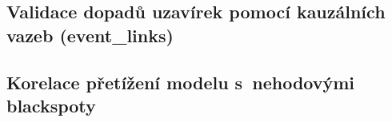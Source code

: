 \subsection{Validace dopadů uzavírek pomocí kauzálních vazeb (event\_links)}
\label{subsec:event-links-validace}
%
%
%

\subsection{Korelace přetížení modelu s~nehodovými blackspoty}
\label{subsec:accident-correlation}
%
%
%
%

